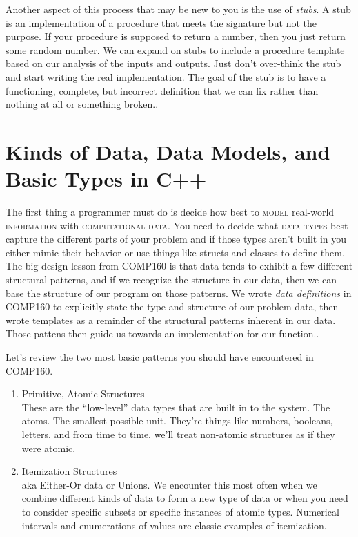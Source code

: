 \documentclass[]{tufte-handout}
\begin{document}
Another aspect of this process that may be new to you is the use of \textit{stubs}. A stub is an implementation of a procedure that meets the signature but not the purpose. If your procedure is supposed to return a number, then you just return some random number. We can expand on stubs to include a procedure template based on our analysis of the inputs and outputs. Just don't over-think the stub and start writing the real implementation. The goal of the stub is to have a functioning,  complete, but incorrect definition that we can fix rather than nothing at all or something broken.. 

\section{Kinds of Data, Data Models, and Basic Types in C++}
	
The first thing a programmer must do is decide how best to \textsc{model} real-world \textsc{information} with \textsc{computational data}. You need to decide what \textsc{data types} best capture the different parts of your problem and if those types aren't built in you either mimic their behavior or use things like structs and classes to define them. The big design lesson from COMP160 is that data tends to exhibit a few different structural patterns, and if we recognize the structure in our data, then we can base the structure of our program on those patterns. We wrote \textit{data definitions} in COMP160 to explicitly state the type and structure of our problem data, then wrote templates as a reminder of the structural patterns inherent in our data. Those pattens then guide us towards an implementation for our function.. 

Let's review the two most basic patterns you should have encountered in COMP160.
\begin{enumerate}

\item Primitive, Atomic Structures \\
These are the ``low-level'' data types that are built in to the system.  The atoms. The smallest possible unit. They're things like numbers, booleans, letters, and from time to time, we'll treat non-atomic structures as if they were atomic.

\item Itemization Structures \\
aka Either-Or data or Unions.  We encounter this most often when we combine different kinds of data to form a new type of data or when you need to consider specific subsets or specific instances of atomic types. Numerical intervals and enumerations of values are classic examples of itemization. 

\end{enumerate}
\end{document}
